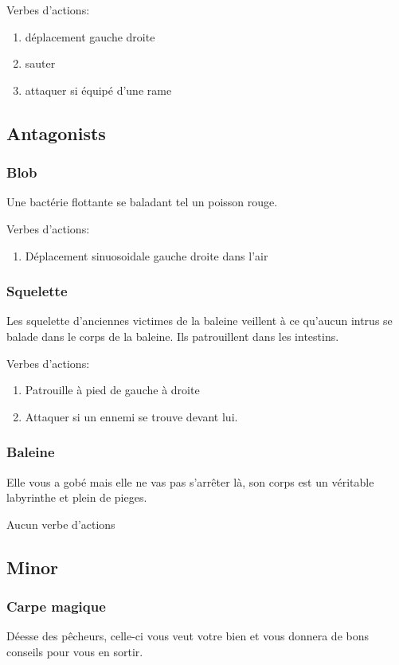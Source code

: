 \documentclass{prologArticle}
\begin{document}
Verbes d'actions:
\begin{enumerate}
    \item déplacement gauche droite
    \item sauter
    \item attaquer si équipé d'une rame
\end{enumerate}

\subsection{Antagonists}

\subsubsection{Blob}
Une bactérie flottante se baladant tel un poisson rouge.

Verbes d'actions:
\begin{enumerate}
    \item Déplacement sinuosoidale gauche droite dans l'air
\end{enumerate}

\subsubsection{Squelette}
Les squelette d'anciennes victimes de la baleine veillent à ce qu'aucun intrus se balade dans le corps de la baleine. Ils patrouillent dans les intestins.

Verbes d'actions:
\begin{enumerate}
    \item Patrouille à pied de gauche à droite
    \item Attaquer si un ennemi se trouve devant lui.
\end{enumerate}

\subsubsection{Baleine}
Elle vous a gobé mais elle ne vas pas s'arrêter là, son corps est un véritable labyrinthe et plein de pieges.

Aucun verbe d'actions

\subsection{Minor}

\subsubsection{Carpe magique}
Déesse des pêcheurs, celle-ci vous veut votre bien et vous donnera de bons conseils pour vous en sortir.
\end{document}
